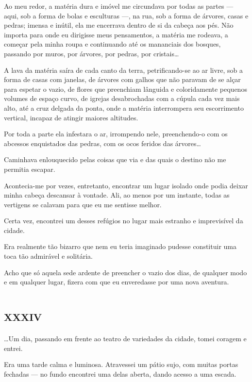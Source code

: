 Ao meu redor, a matéria dura e imóvel me circundava por todas as partes --- aqui, sob a forma de bolas e esculturas ---, na rua, sob a forma de árvores, casas e pedras; imensa e inútil, ela me encerrava dentro de si da cabeça aos pés. Não importa para onde eu dirigisse meus pensamentos, a matéria me rodeava, a começar pela minha roupa e continuando até os mananciais dos bosques, passando por muros, por árvores, por pedras, por cristais\dots

A lava da matéria saíra de cada canto da terra, petrificando-se ao ar livre, sob a forma de casas com janelas, de árvores com galhos que não paravam de se alçar para espetar o vazio, de flores que preenchiam lânguida e coloridamente pequenos volumes de espaço curvo, de igrejas desabrochadas com a cúpula cada vez mais alto, até a cruz delgada da ponta, onde a matéria interrompera seu escorrimento vertical, incapaz de atingir maiores altitudes.

Por toda a parte ela infestara o ar, irrompendo nele, preenchendo-o com os abcessos enquistados das pedras, com os ocos feridos das árvores\dots

Caminhava enlouquecido pelas coisas que via e das quais o destino não me permitia escapar.

Acontecia-me por vezes, entretanto, encontrar um lugar isolado onde podia deixar minha cabeça descansar à vontade. Ali, ao menos por um instante, todas as vertigens se calavam para que eu me sentisse melhor.

Certa vez, encontrei um desses refúgios no lugar mais estranho e imprevisível da cidade.

Era realmente tão bizarro que nem eu teria imaginado pudesse constituir uma toca tão admirável e solitária.

Acho que só aquela sede ardente de preencher o vazio dos dias, de qualquer modo e em qualquer lugar, fizera com que eu enveredasse por uma nova aventura.


\chapter*{\huge\centering\textsc{xxxiv}}

\dots Um dia, passando em frente ao teatro de variedades da cidade, tomei coragem e entrei.

Era uma tarde calma e luminosa. Atravessei um pátio sujo, com muitas portas fechadas --- no fundo encontrei uma delas aberta, dando acesso a uma escada.

